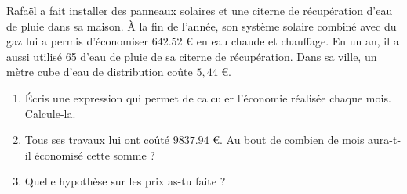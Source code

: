 
\begin{exercice}\label{exosmath-0733}


    Rafaël a fait installer des panneaux solaires et une citerne de récupération d'eau de pluie dans sa maison. À la fin de l'année, son système solaire combiné avec du gaz lui a permis d'économiser $642.52$ € en eau chaude et chauffage. En un an, il a aussi utilisé \unit{65}{\cubic\meter} d'eau de pluie de sa citerne de récupération.  Dans sa ville, un mètre cube d'eau de distribution coûte $5,44$ €.
    
    \begin{enumerate}
        \item
            
    Écris une expression qui permet de calculer l'économie réalisée chaque mois. Calcule-la.  
    
\item
     Tous ses travaux lui ont coûté $9 837.94$ €. Au bout de combien de mois aura-t-il économisé cette somme ?
    
 \item
     Quelle hypothèse sur les prix as-tu faite ?
    \end{enumerate}

\end{exercice}
